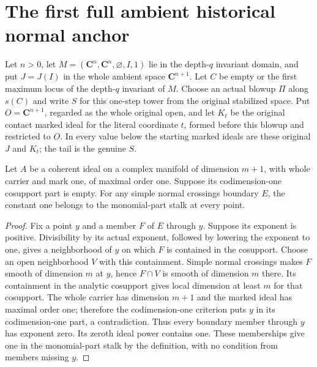 \section{The first full ambient historical normal anchor}

\begin{definition}
\label{hir:disjoint-first-step-normal-history}
\leanok
Let $n>0$, let $M=(\mathbf C^n,\mathbf C^n,\varnothing,I,1)$ lie in the
depth-$q$ invariant domain, and put $J=J(I)$ in the whole ambient space
$\mathbf C^{n+1}$. Let $C$ be empty or the first maximum locus of the
depth-$q$ invariant of $M$. Choose an actual blowup $\Pi$ along $s(C)$ and
write $S$ for this one-step tower from the original stabilized space. Put
$O=\mathbf C^{n+1}$, regarded as the whole original open, and let $K_t$ be
the original contact marked ideal for the literal coordinate $t$, formed
before this blowup and restricted to $O$. In every value below the starting
marked ideals are these original $J$ and $K_t$; the tail is the genuine $S$.
\end{definition}

\begin{lemma}
\label{hir:disjoint-full-ambient-unit-monomial-stalk}
\leanok
Let $A$ be a coherent ideal on a complex manifold of dimension $m+1$,
with whole carrier and mark one, of maximal order one. Suppose its
codimension-one cosupport part is empty. For any simple normal crossings
boundary $E$, the constant one belongs to the monomial-part stalk at every point.
\end{lemma}
\begin{proof}
Fix a point $y$ and a member $F$ of $E$ through $y$. Suppose its exponent
is positive. Divisibility by its actual exponent, followed by lowering the
exponent to one, gives a neighborhood of $y$ on which $F$ is contained in
the cosupport. Choose an open neighborhood $V$ with this containment.
Simple normal crossings makes $F$ smooth of dimension $m$ at $y$, hence
$F\cap V$ is smooth of dimension $m$ there. Its containment in the analytic
cosupport gives local dimension at least $m$ for that cosupport. The whole
carrier has dimension $m+1$ and the marked ideal has maximal order one;
therefore the codimension-one criterion puts $y$ in its codimension-one
part, a contradiction. Thus every boundary member through $y$ has exponent
zero. Its zeroth ideal power contains one. These memberships give one in
the monomial-part stalk by the definition, with no condition from members missing $y$.
\end{proof}

